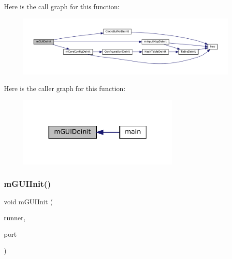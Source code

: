Here is the call graph for this function\+:
\nopagebreak
\begin{figure}[H]
\begin{center}
\leavevmode
\includegraphics[width=350pt]{gui-runner_8c_a678712d99d73e15cac15d188ea82d5d8_cgraph}
\end{center}
\end{figure}
Here is the caller graph for this function\+:
\nopagebreak
\begin{figure}[H]
\begin{center}
\leavevmode
\includegraphics[width=231pt]{gui-runner_8c_a678712d99d73e15cac15d188ea82d5d8_icgraph}
\end{center}
\end{figure}
\mbox{\label{gui-runner_8c_a95b3becf7824ec02882a9db0686ce3a3}} 
\subsubsection{\texorpdfstring{m\+G\+U\+I\+Init()}{mGUIInit()}}
{\footnotesize\ttfamily void m\+G\+U\+I\+Init (\begin{DoxyParamCaption}\item[{struct \mbox{\hyperlink{structm_g_u_i_runner}{m\+G\+U\+I\+Runner}} $\ast$}]{runner,  }\item[{const char $\ast$}]{port }\end{DoxyParamCaption})}

